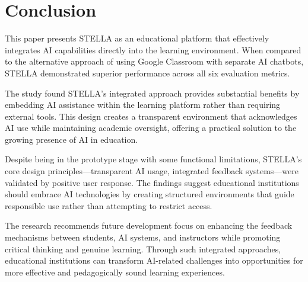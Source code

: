 \documentclass[sigconf,natbib=true]{acmart}
\begin{document}
\section{Conclusion}
This paper presents STELLA as an educational platform that effectively integrates AI capabilities directly into the learning environment. When compared to the alternative approach of using Google Classroom with separate AI chatbots, STELLA demonstrated superior performance across all six evaluation metrics.

The study found STELLA's integrated approach provides substantial benefits by embedding AI assistance within the learning platform rather than requiring external tools. This design creates a transparent environment that acknowledges AI use while maintaining academic oversight, offering a practical solution to the growing presence of AI in education.

Despite being in the prototype stage with some functional limitations, STELLA's core design principles—transparent AI usage, integrated feedback systems—were validated by positive user response. The findings suggest educational institutions should embrace AI technologies by creating structured environments that guide responsible use rather than attempting to restrict access.

The research recommends future development focus on enhancing the feedback mechanisms between students, AI systems, and instructors while promoting critical thinking and genuine learning. Through such integrated approaches, educational institutions can transform AI-related challenges into opportunities for more effective and pedagogically sound learning experiences.



\end{document}

